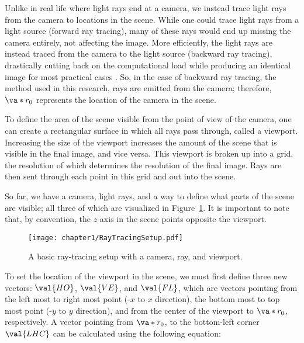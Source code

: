 \par Unlike in real life where light rays end at a camera, we instead trace light rays from the camera to locations in the scene. While one could trace light rays from a light source (forward ray tracing), many of these rays would end up missing the camera entirely, not affecting the image. More efficiently, the light rays are instead traced from the camera to the light source (backward ray tracing), drastically cutting back on the computational load while producing an identical image for most practical cases \cite{Peddie}. So, in the case of backward ray tracing, the method used in this research, rays are emitted from the camera; therefore, $\va*{r_0}$ represents the location of the camera in the scene.

\par To define the area of the scene visible from the point of view of the camera, one can create a rectangular surface in which all rays pass through, called a viewport. Increasing the size of the viewport increases the amount of the scene that is visible in the final image, and vice versa. This viewport is broken up into a grid, the resolution of which determines the resolution of the final image. Rays are then sent through each point in this grid and out into the scene.

\par So far, we have a camera, light rays, and a way to define what parts of the scene are visible; all three of which are visualized in Figure~\ref{fig:basic_ray_tracing_setup}. It is important to note that, by convention, the $z$-axis in the scene points opposite the viewport.

\begin{figure}[H]
  \centering
\texttt{[image: chapter1/RayTracingSetup.pdf]}
\caption{A basic ray-tracing setup with a camera, ray, and viewport.}
\label{fig:basic_ray_tracing_setup}
\end{figure}

\par To set the location of the viewport in the scene, we must first define three new vectors: $\val{HO}$, $\val{VE}$, and $\val{FL}$, which are vectors pointing from the left most to right most point (-$x$ to $x$ direction), the bottom most to top most point (-$y$ to $y$ direction), and from the center of the viewport to $\va*{r_0}$, respectively. A vector pointing from $\va*{r_0}$, to the bottom-left corner $\val{LHC}$ can be calculated using the following equation:

